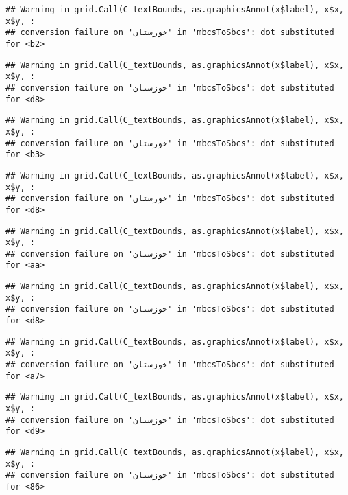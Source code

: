 \documentclass[
]{article}
\begin{document}
\begin{verbatim}
## Warning in grid.Call(C_textBounds, as.graphicsAnnot(x$label), x$x, x$y, :
## conversion failure on 'خوزستان' in 'mbcsToSbcs': dot substituted for <b2>
\end{verbatim}

\begin{verbatim}
## Warning in grid.Call(C_textBounds, as.graphicsAnnot(x$label), x$x, x$y, :
## conversion failure on 'خوزستان' in 'mbcsToSbcs': dot substituted for <d8>
\end{verbatim}

\begin{verbatim}
## Warning in grid.Call(C_textBounds, as.graphicsAnnot(x$label), x$x, x$y, :
## conversion failure on 'خوزستان' in 'mbcsToSbcs': dot substituted for <b3>
\end{verbatim}

\begin{verbatim}
## Warning in grid.Call(C_textBounds, as.graphicsAnnot(x$label), x$x, x$y, :
## conversion failure on 'خوزستان' in 'mbcsToSbcs': dot substituted for <d8>
\end{verbatim}

\begin{verbatim}
## Warning in grid.Call(C_textBounds, as.graphicsAnnot(x$label), x$x, x$y, :
## conversion failure on 'خوزستان' in 'mbcsToSbcs': dot substituted for <aa>
\end{verbatim}

\begin{verbatim}
## Warning in grid.Call(C_textBounds, as.graphicsAnnot(x$label), x$x, x$y, :
## conversion failure on 'خوزستان' in 'mbcsToSbcs': dot substituted for <d8>
\end{verbatim}

\begin{verbatim}
## Warning in grid.Call(C_textBounds, as.graphicsAnnot(x$label), x$x, x$y, :
## conversion failure on 'خوزستان' in 'mbcsToSbcs': dot substituted for <a7>
\end{verbatim}

\begin{verbatim}
## Warning in grid.Call(C_textBounds, as.graphicsAnnot(x$label), x$x, x$y, :
## conversion failure on 'خوزستان' in 'mbcsToSbcs': dot substituted for <d9>
\end{verbatim}

\begin{verbatim}
## Warning in grid.Call(C_textBounds, as.graphicsAnnot(x$label), x$x, x$y, :
## conversion failure on 'خوزستان' in 'mbcsToSbcs': dot substituted for <86>
\end{verbatim}
\end{document}
